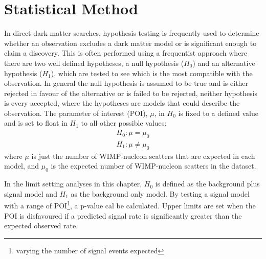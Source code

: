 \section{Statistical Method}

\par
In direct dark matter searches, hypothesis testing is frequently used to determine whether an observation excludes a dark matter model or is significant enough to claim a discovery.
This is often performed using a frequentist approach where there are two well defined hypotheses, a null hypothesis ($H_0$) and an alternative hypothesis ($H_1$), which are tested to see which is the most compatible with the observation.
In general the null hypothesis is assumed to be true and is either rejected in favour of the alternative or is failed to be rejected, neither hypothesis is every accepted, where the hypotheses are models that could describe the observation.
The parameter of interest (POI), $\mu$, in $H_0$ is fixed to a defined value and is set to float in $H_1$ to all other possible values:
\begin{equation}
    \begin{split}
        H_0: \mu = \mu_0 \\
        H_1: \mu \neq \mu_0
    \end{split}
\end{equation}
where $\mu$ is just the number of WIMP-nucleon scatters that are expected in each model, and $\mu_0$ is the expected number of WIMP-nucleon scatters in the dataset.

\par
In the limit setting analyses in this chapter, $H_0$ is defined as the background plus signal model and $H_1$ as the background only model.
By testing a signal model with a range of POI\footnote{varying the number of signal events expected}, a p-value cal be calculated. 
Upper limits are set when the POI is disfavoured if a predicted signal rate is significantly greater than the expected observed rate.

